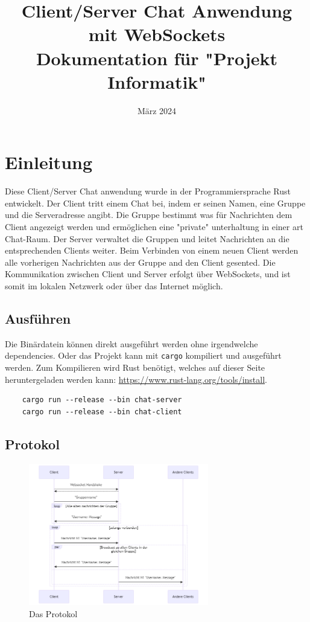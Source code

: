 \documentclass[a4paper]{article}
\title{
\LARGE{Client/Server Chat Anwendung mit WebSockets}  \\ 
\normalsize{Dokumentation für "Projekt Informatik"}
}
\author{}
\date{März 2024}
\begin{document}
\maketitle

\tableofcontents


\section{Einleitung}

Diese Client/Server Chat anwendung wurde in der Programmiersprache Rust entwickelt. Der Client tritt einem Chat bei, indem er seinen Namen, eine Gruppe und die Serveradresse angibt. Die Gruppe bestimmt was für Nachrichten dem Client angezeigt werden und ermöglichen eine "private" unterhaltung in einer art Chat-Raum. Der Server verwaltet die Gruppen und leitet Nachrichten an die entsprechenden Clients weiter. Beim Verbinden von einem neuen Client werden alle vorherigen Nachrichten aus der Gruppe and den Client gesented. Die Kommunikation zwischen Client und Server erfolgt über WebSockets, und ist somit im lokalen Netzwerk oder über das Internet möglich.

\pagebreak[4]

\subsection{Ausführen}

Die Binärdatein können direkt ausgeführt werden ohne irgendwelche dependencies. Oder das Projekt kann mit \texttt{cargo} kompiliert und ausgeführt werden. Zum Kompilieren wird Rust benötigt, welches auf dieser Seite heruntergeladen werden kann: \url{https://www.rust-lang.org/tools/install}.
\begin{verbatim}
    cargo run --release --bin chat-server
    cargo run --release --bin chat-client
\end{verbatim}

\subsection{Protokol}

\begin{figure}[H]
    \centering
    \includegraphics[width=0.70\textwidth]{protocol2.png}
    \caption{Das Protokol}\label{fig:protocol}
\end{figure}
\end{document}
